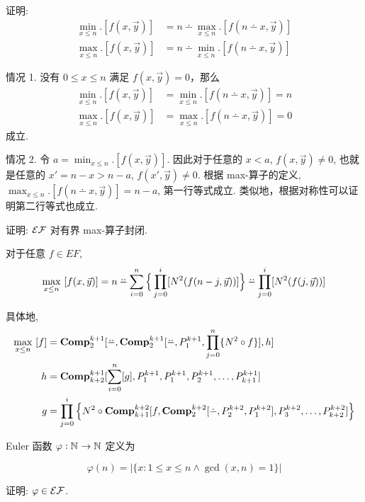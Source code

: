 \begin{problem}
证明:
\begin{align*}
\min_{x \le n}. [f(x, \vec{y})] & = n \dotminus \max_{x \le n}. [f(n \dotminus x, \vec{y})] \\
\max_{x \le n}. [f(x, \vec{y})] & = n \dotminus \min_{x \le n}. [f(n \dotminus x, \vec{y})]
\end{align*}
\end{problem}

\begin{solution}
情况 1. 没有 $0 \le x \le n$ 满足 $f(x, \vec{y}) = 0$，那么
\begin{align*}
  \min_{x \le n}. [f(x, \vec{y})] & = \min_{x \le n}. [f(n \dotminus x, \vec{y})] = n \\
  \max_{x \le n}. [f(x, \vec{y})] & = \max_{x \le n}. [f(n \dotminus x, \vec{y})] = 0
\end{align*}
成立.

情况 2. 令 $a = \min_{x \le n}. [f(x, \vec{y})]$. 因此对于任意的 $x < a$, $f(x, \vec{y}) \neq 0$, 也就是任意的 $x' = n - x > n - a$, $f(x', \vec{y}) \neq 0$. 根据 max-算子的定义, $\max_{x \le n}. [f(n \dotminus x, \vec{y})] = n - a$, 第一行等式成立. 类似地，根据对称性可以证明第二行等式也成立.

\end{solution}

\begin{problem}
证明: $\mathcal{EF}$ 对有界 max-算子封闭.
\end{problem}

\begin{solution}
对于任意 $f \in EF$,
\[
\max_{x \le n} ~ [f(x, \vec{y})] = n \dotdotminus \sum_{i = 0}^n \Big \{ \prod_{j=0}^i [ N^2(f(n - j, \vec{y})) ] \Big \} \dotdotminus \prod_{j=0}^i [ N^2(f(j, \vec{y})) ]
\]

具体地,
\begin{align*}
\max_{x \le n} ~ [f] & = \comp{k+1}{2}{\dotdotminus, \comp{k+1}{2}{\dotdotminus, P^{k+1}_1, \prod_{j=0}^n \{ N^2 \circ f \} }, h} \\
h & = \comp{k+1}{k+2}{\sum_{i=0}^n [g], P^{k+1}_1, P^{k+1}_1, P^{k+1}_2, \dots, P^{k+1}_{k+1}} \\
g & = \prod_{j=0}^i \Big \{ N^2 \circ \comp{k+2}{k+1}{f, \comp{k+2}{2}{\dotminus, P^{k+2}_2, P^{k+2}_1}, P^{k+2}_{3}, \dots, P^{k+2}_{k+2}} \Big \}
\end{align*}
\end{solution}

\begin{problem}
Euler 函数 $\varphi : \mathbb{N}^{} \to \mathbb{N}^{}$ 定义为

\[
\varphi(n) = | \{ x : 1 \le x \le n \land \gcd(x, n) = 1 \} |
\]

证明: $\varphi \in \mathcal{EF}$.
\end{problem}

